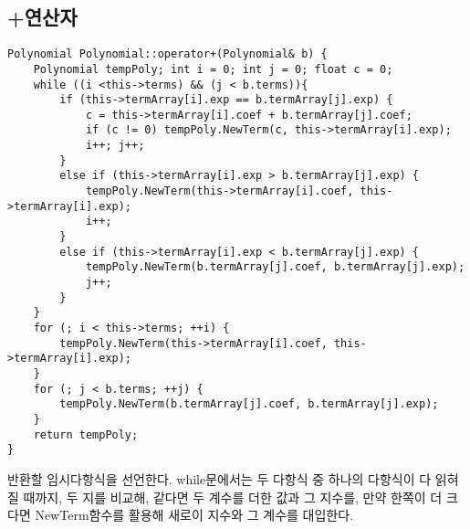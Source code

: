 \documentclass[a4paper,11pt]{article}
\begin{document}
\subsection{+연산자}
\begin{Verbatim}
Polynomial Polynomial::operator+(Polynomial& b) {
	Polynomial tempPoly; int i = 0; int j = 0; float c = 0;
	while ((i <this->terms) && (j < b.terms)){
		if (this->termArray[i].exp == b.termArray[j].exp) {
			c = this->termArray[i].coef + b.termArray[j].coef;
			if (c != 0) tempPoly.NewTerm(c, this->termArray[i].exp);
			i++; j++;
		}
		else if (this->termArray[i].exp > b.termArray[j].exp) {
			tempPoly.NewTerm(this->termArray[i].coef, this->termArray[i].exp);
			i++;
		}
		else if (this->termArray[i].exp < b.termArray[j].exp) {
			tempPoly.NewTerm(b.termArray[j].coef, b.termArray[j].exp);
			j++;
		}
	}
	for (; i < this->terms; ++i) {
		tempPoly.NewTerm(this->termArray[i].coef, this->termArray[i].exp);
	}
	for (; j < b.terms; ++j) {
		tempPoly.NewTerm(b.termArray[j].coef, b.termArray[j].exp);
	}
	return tempPoly;
}
\end{Verbatim}
 반환할 임시다항식을 선언한다. while문에서는 두 다항식 중 하나의 다항식이 다 읽혀질 때까지, 두 지를 비교해, 같다면 두 계수를 더한 값과 그 지수를, 만약 한쪽이 더 크다면 NewTerm함수를 활용해 새로이 지수와 그 계수를 대입한다.
\end{document}
